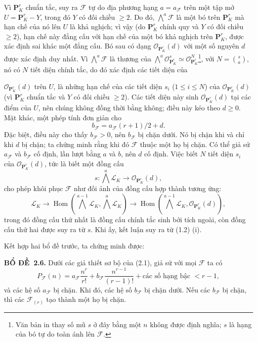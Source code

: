 \documentclass[11pt,twoside,openany]{book}
\numberwithin{equation}{section}
\newcommand{\src}[1]{%
  \phantomsection\hypertarget{src:\fgasourceid:#1}{}%
  \marginpar{\raggedleft\footnotesize\sffamily #1}%
}
\newcommand{\fgasourceid}{unset}
\newcommand{\result}[2]{\par\medskip\noindent\textbf{#1\if\relax\detokenize{#2}\relax\else\ #2\fi.}\quad}
\begin{document}
Vì $\mathbf P^r_K$ chuẩn tắc, suy ra $\mathcal F$ tự do địa phương hạng
$a=a_{\mathcal F}$ trên một tập mở $U=\mathbf P^r_K-Y$, trong đó $Y$ có đối
chiều $\geq2$. Do đó, $\bigwedge^a\mathcal F$ là một bó trên
$\mathbf P^r_K$ mà hạn chế của nó lên $U$ là khả nghịch; vì vậy (do
$\mathbf P^r_K$ chính quy và $Y$ có đối chiều $\geq2$), hạn chế này đẳng cấu
với hạn chế của một bó khả nghịch trên $\mathbf P^r_K$, được xác định sai khác
một đẳng cấu. Bó sau có dạng $\mathcal O_{\mathbf P^r_K}(d)$ với một số nguyên
$d$ được xác định duy nhất. Vì $\bigwedge^a\mathcal F$ là thương của
$\bigwedge^a\mathcal O_{\mathbf P^r_K}^{s}\simeq
\mathcal O_{\mathbf P^r_K}^{N}$\footnote{Văn bản in thay số mũ $s$ ở đây bằng
một $n$ không được định nghĩa; $s$ là hạng của bó tự do toàn ánh lên
$\mathcal F$.}, với $N=\binom{s}{a}$, nó có $N$ tiết diện chính tắc, do đó xác
định các tiết diện của
\src{257}
$\mathcal O_{\mathbf P^r_K}(d)$ trên $U$, là những hạn chế của các tiết diện
$s_i$ ($1\leq i\leq N$) của $\mathcal O_{\mathbf P^r_K}(d)$ (vì
$\mathbf P^r_K$ chuẩn tắc và $Y$ có đối chiều $\geq2$). Các tiết diện này sinh
$\mathcal O_{\mathbf P^r_K}(d)$ tại các điểm của $U$, nên chúng không đồng thời
bằng không; điều này kéo theo $d\geq0$. Mặt khác, một phép tính đơn giản cho
\[
b_{\mathcal F}=a_{\mathcal F}(r+1)/2+d.
\]
Đặc biệt, điều này cho thấy $b_{\mathcal F}>0$, nên $b_{\mathcal F}$ bị chặn
dưới. Nó bị chặn khi và chỉ khi $d$ bị chặn; ta chứng minh rằng khi đó
$\mathcal F$ thuộc một họ bị chặn. Có thể giả sử $a_{\mathcal F}$ và
$b_{\mathcal F}$ cố định, lần lượt bằng $a$ và $b$, nên $d$ cố định. Việc biết
$N$ tiết diện $s_i$ của $\mathcal O_{\mathbf P^r_K}(d)$, tức là biết một đồng
cấu
\[
s:\bigwedge^a\mathcal L_K\longrightarrow\mathcal O_{\mathbf P^r_K}(d),
\]
cho phép khôi phục $\mathcal F$ như đối ảnh của đồng cấu hợp thành tương ứng:
\[
\mathcal L_K\longrightarrow
\operatorname{Hom}\!\left(\bigwedge^{a-1}\mathcal L_K,
\bigwedge^a\mathcal L_K\right)\longrightarrow
\operatorname{Hom}\!\left(\bigwedge^{a-1}\mathcal L_K,
\mathcal O_{\mathbf P^r_K}(d)\right),
\]
trong đó đồng cấu thứ nhất là đồng cấu chính tắc sinh bởi tích ngoài, còn đồng
cấu thứ hai được suy ra từ $s$. Khi ấy, kết luận suy ra từ (1.2) (i).

Kết hợp hai bổ đề trước, ta chứng minh được:

\result{BỔ ĐỀ}{2.6} Dưới các giả thiết sơ bộ của (2.1), giả sử với mọi
$\mathcal F$ ta có
\[
P_{\mathcal F}(n)=a_{\mathcal F}\frac{n^r}{r!}
+b_{\mathcal F}\frac{n^{r-1}}{(r-1)!}
+\text{các số hạng bậc $<r-1$},
\]
và các hệ số $a_{\mathcal F}$ bị chặn. Khi đó, các hệ số $b_{\mathcal F}$ bị
chặn dưới. Nếu các $b_{\mathcal F}$ bị chặn, thì các $\mathcal F_{(r)}$ tạo
thành một họ bị chặn.
\end{document}
